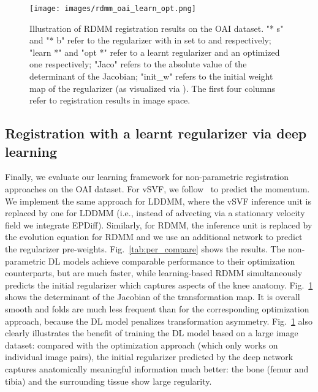 \documentclass{article}
\numberwithin{equation}{section}
\newcommand{\ie}{{i.e.}}
\begin{document}
\begin{figure}[!t]
  \begin{center}
    \texttt{[image: images/rdmm\_oai\_learn\_opt.png]}
  \end{center}
  \caption{\label{fig:oai_img}Illustration of RDMM registration results on the OAI dataset. "* s" and "* b" refer to the regularizer with  in  set to  and  respectively; "learn *" and "opt *" refer to a learnt regularizer and an optimized one respectively; "Jaco" refers to the absolute value of the determinant of the Jacobian; "init\_w" refers to the initial weight map of the regularizer (as visualized via ). The first four columns refer to registration results in image space.\vspace{-0.5cm}}\end{figure}


\subsection{Registration with a learnt regularizer via deep learning}
\label{subsec:rdmm_deep_learning}

Finally, we evaluate our learning framework for non-parametric registration approaches on the OAI dataset. For vSVF, we follow~\citep{shen2019networks} to predict the momentum. We implement the same approach for LDDMM, where the vSVF inference unit is replaced by one for LDDMM (\ie, instead of advecting via a stationary velocity field we integrate EPDiff). Similarly, for RDMM, the inference unit is replaced by the evolution equation for RDMM and we use an additional network to predict the regularizer pre-weights. Fig.~\ref{tab:per_compare} shows the results. The non-parametric DL models achieve comparable performance to their optimization counterparts, but are much faster, while learning-based RDMM simultaneously predicts the initial regularizer which captures aspects of the knee anatomy. Fig.~\ref{fig:oai_img} shows the determinant of the Jacobian of the transformation map. It is overall smooth and folds are much less frequent than for the corresponding optimization approach, because the DL model penalizes transformation asymmetry. Fig.~\ref{fig:oai_img} also clearly illustrates the benefit of training the DL model based on a large image dataset: compared with the optimization approach (which only works on individual image pairs), the initial regularizer predicted by the deep network captures anatomically meaningful information much better: the bone (femur and tibia) and the surrounding tissue show large regularity.
\end{document}
